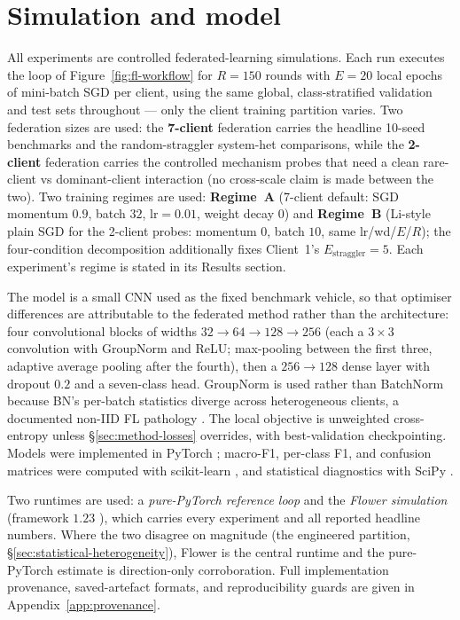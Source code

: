 \documentclass[11pt,a4paper]{report}
\begin{document}
\section{Simulation and model}
\label{sec:method-simulation}

All experiments are controlled federated-learning simulations. Each run executes the loop of Figure~\ref{fig:fl-workflow} for $R = 150$ rounds
with $E = 20$ local epochs of mini-batch SGD per client, using the same global,
class-stratified validation and test sets throughout --- only the client training
partition varies. Two federation sizes are used: the \textbf{7-client} federation carries the
headline 10-seed benchmarks and the random-straggler system-het comparisons, while
the \textbf{2-client} federation carries the controlled mechanism probes that need
a clean rare-client vs dominant-client interaction (no cross-scale claim is made
between the two). Two training regimes are used: \textbf{Regime~A} (7-client
default: SGD momentum $0.9$, batch $32$, $\textrm{lr} = 0.01$, weight decay $0$)
and \textbf{Regime~B} (Li-style plain SGD for the 2-client probes: momentum $0$,
batch $10$, same lr/wd/$E$/$R$); the four-condition decomposition additionally
fixes Client~1's $E_{\textrm{straggler}} = 5$. Each experiment's regime is stated
in its Results section.

The model is a small CNN used as the fixed benchmark vehicle, so that optimiser
differences are attributable to the federated method rather than the architecture:
four convolutional blocks of widths $32 \to 64 \to 128 \to 256$ (each a $3 \times 3$
convolution with GroupNorm \citep{wu2018groupnorm} and ReLU; max-pooling between
the first three, adaptive average pooling after the fourth), then a $256 \to 128$
dense layer with dropout $0.2$ and a seven-class head. GroupNorm is used rather
than BatchNorm because BN's per-batch statistics diverge across heterogeneous
clients, a documented non-IID FL pathology \citep{hsieh2020quagmire, li2021fedbn}. The local
objective is unweighted cross-entropy unless \S\ref{sec:method-losses} overrides,
with best-validation checkpointing. Models were implemented in PyTorch
\citep{paszke2019pytorch}; macro-F1, per-class F1, and confusion matrices were
computed with scikit-learn \citep{pedregosa2011scikit}, and statistical diagnostics
with SciPy \citep{virtanen2020scipy}.

\label{sec:method-runtimes}
Two runtimes are used: a \emph{pure-PyTorch reference loop} and the \emph{Flower
simulation} (framework $1.23$ \citep{beutel2020flower}), which carries every
experiment and all reported headline numbers. Where the two disagree on magnitude
(the engineered partition, \S\ref{sec:statistical-heterogeneity}), Flower is the
central runtime and the pure-PyTorch estimate is direction-only corroboration.
Full implementation provenance, saved-artefact formats, and reproducibility guards
are given in Appendix~\ref{app:provenance}.
\end{document}
